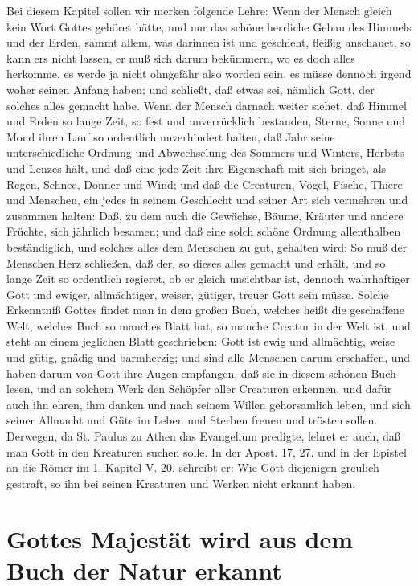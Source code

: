 Bei diesem Kapitel sollen wir merken folgende Lehre: Wenn der Mensch gleich kein Wort Gottes gehöret hätte, und nur das schöne herrliche Gebau des Himmels und der Erden, sammt allem, was darinnen ist und geschieht, fleißig anschauet, so kann ers nicht lassen, er muß sich darum bekümmern, wo es doch alles herkomme, es werde ja nicht ohngefähr also worden sein, es müsse dennoch irgend woher seinen Anfang haben; und schließt, daß etwas sei, nämlich Gott, der solches alles gemacht habe. Wenn der Mensch darnach weiter siehet, daß Himmel und Erden so lange Zeit, so fest und unverrücklich bestanden, Sterne, Sonne und Mond ihren Lauf so ordentlich unverhindert halten, daß Jahr seine unterschiedliche Ordnung und Abwechselung des Sommers und Winters, Herbsts und Lenzes hält, und daß eine jede Zeit ihre Eigenschaft mit sich bringet, als Regen, Schnee, Donner und Wind; und daß die Creaturen, Vögel, Fische, Thiere und Menschen, ein jedes in seinem Geschlecht und seiner Art sich vermehren und zusammen halten: Daß, zu dem auch die Gewächse, Bäume, Kräuter und andere Früchte, sich jährlich besamen; und daß eine solch schöne Ordnung allenthalben beständiglich, und solches alles dem Menschen zu gut, gehalten wird: So muß der Menschen Herz schließen, daß der, so dieses alles gemacht und erhält, und so lange Zeit so ordentlich regieret, ob er gleich unsichtbar ist, dennoch wahrhaftiger Gott und ewiger, allmächtiger, weiser, gütiger, treuer Gott sein müsse. Solche Erkenntniß Gottes findet man in dem großen Buch, welches heißt die geschaffene Welt, welches Buch so manches Blatt hat, so manche Creatur in der Welt ist, und steht an einem jeglichen Blatt geschrieben: Gott ist ewig und allmächtig, weise und gütig, gnädig und barmherzig; und sind alle Menschen darum erschaffen, und haben darum von Gott ihre Augen empfangen, daß sie in diesem schönen Buch lesen, und an solchem Werk den Schöpfer aller Creaturen erkennen, und dafür auch ihn ehren, ihm
danken und nach seinem Willen gehorsamlich leben, und sich seiner Allmacht und Güte im Leben und Sterben freuen und trösten sollen. Derwegen, da St. Paulus zu Athen das Evangelium predigte, lehret er auch, daß man Gott in den Kreaturen suchen solle. In der Apost. 17, 27. und in der Epistel an die Römer im 1. Kapitel V. 20. schreibt er: Wie Gott diejenigen greulich gestraft, so ihn bei seinen Kreaturen und Werken nicht erkannt haben.

\section{Gottes Majestät wird aus dem Buch der Natur erkannt}

